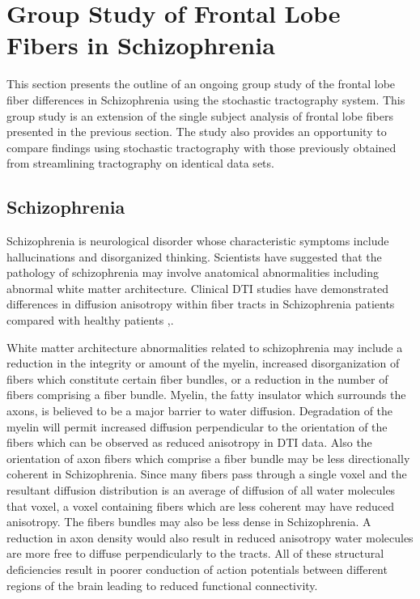 \chapter{Group Study of Frontal Lobe Fibers in Schizophrenia}
This section presents the outline of an ongoing group study of the frontal lobe fiber differences in Schizophrenia using the stochastic tractography system.  This group study is an extension of the single subject analysis of frontal lobe fibers presented in the previous section.  The study also provides an opportunity to compare findings using stochastic tractography with those previously obtained from streamlining tractography on identical data sets.
\section{Schizophrenia}
Schizophrenia is neurological disorder whose characteristic symptoms include hallucinations and disorganized thinking.  Scientists have suggested that the pathology of schizophrenia may involve anatomical abnormalities including abnormal white matter architecture.  Clinical DTI studies have demonstrated differences in diffusion anisotropy within fiber tracts in Schizophrenia patients compared with healthy patients \cite{kubickiBiologPsych03},\cite{kubickiNI05}.

White matter architecture abnormalities related to schizophrenia may include a reduction in the integrity or amount of the myelin, increased disorganization of fibers which constitute certain fiber bundles, or a reduction in the number of fibers comprising a fiber bundle. Myelin, the fatty insulator which surrounds the axons, is believed to be a major barrier to water diffusion.  Degradation of the myelin will permit increased diffusion perpendicular to the orientation of the fibers which can be observed as reduced anisotropy in DTI data.  Also the orientation of axon fibers which comprise a fiber bundle may be less directionally coherent in Schizophrenia.  Since many fibers pass through a single voxel and the resultant diffusion distribution is an average of diffusion of all water molecules that voxel, a voxel containing fibers which are less coherent may have reduced anisotropy.  The fibers bundles may also be less dense in Schizophrenia.  A reduction in axon density would also result in reduced anisotropy water molecules are more free to diffuse perpendicularly to the tracts.  All of these structural deficiencies result in poorer conduction of action potentials between different regions of the brain leading to reduced functional connectivity.

